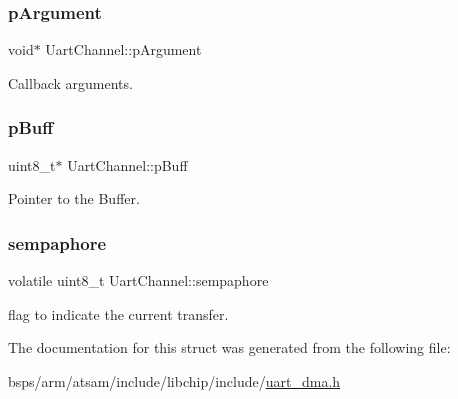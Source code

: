 \subsubsection{\texorpdfstring{pArgument}{pArgument}}
{\footnotesize\ttfamily void$\ast$ Uart\+Channel\+::p\+Argument}

Callback arguments. \mbox{\label{structUartChannel_ae40c80620ff724da404a7ee5d889ebaf}} 
\subsubsection{\texorpdfstring{pBuff}{pBuff}}
{\footnotesize\ttfamily uint8\+\_\+t$\ast$ Uart\+Channel\+::p\+Buff}

Pointer to the Buffer. \mbox{\label{structUartChannel_ac71a5b29d292b5fcb48d5ab0292dff8f}} 
\subsubsection{\texorpdfstring{sempaphore}{sempaphore}}
{\footnotesize\ttfamily volatile uint8\+\_\+t Uart\+Channel\+::sempaphore}

flag to indicate the current transfer. 

The documentation for this struct was generated from the following file\+:\begin{DoxyCompactItemize}
\item 
bsps/arm/atsam/include/libchip/include/\mbox{\hyperlink{uart__dma_8h}{uart\+\_\+dma.\+h}}\end{DoxyCompactItemize}
